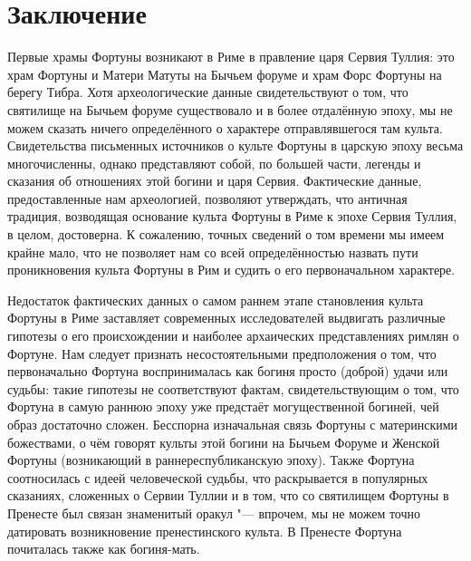 \chapter*{Заключение}



Первые храмы Фортуны возникают в Риме в правление царя Сервия Туллия: это храм Фортуны и Матери Матуты на Бычьем форуме и храм Форс Фортуны на берегу Тибра. Хотя археологические данные свидетельствуют о том, что святилище на Бычьем форуме существовало и в более отдалённую эпоху, мы не можем сказать ничего определённого о характере отправлявшегося там культа. Свидетельства письменных источников о культе Фортуны в царскую эпоху весьма многочисленны, однако представляют собой, по большей части, легенды и сказания об отношениях этой богини и царя Сервия. Фактические данные, предоставленные нам археологией, позволяют утверждать, что античная традиция, возводящая основание культа Фортуны в Риме к эпохе Сервия Туллия, в целом, достоверна. К сожалению, точных сведений о том времени мы имеем крайне мало, что не позволяет нам со всей определённостью назвать пути проникновения культа Фортуны в Рим и судить о его первоначальном характере.

Недостаток фактических данных о самом раннем этапе становления культа Фортуны в Риме заставляет современных исследователей выдвигать различные гипотезы о его происхождении и наиболее архаических представлениях римлян о Фортуне. Нам следует признать несостоятельными предположения о том, что первоначально Фортуна воспринималась как богиня просто (доброй) удачи или судьбы: такие гипотезы не соответствуют фактам, свидетельствующим о том, что Фортуна в самую раннюю эпоху уже предстаёт могущественной богиней, чей образ достаточно сложен. Бесспорна изначальная связь Фортуны с материнскими божествами, о чём говорят культы этой богини на Бычьем Форуме и Женской Фортуны (возникающий в раннереспубликанскую эпоху). Также Фортуна соотносилась с идеей человеческой судьбы, что раскрывается в популярных сказаниях, сложенных о Сервии Туллии и в том, что со святилищем Фортуны в Пренесте был связан знаменитый оракул "--- впрочем, мы не можем точно датировать возникновение пренестинского культа. В Пренесте Фортуна почиталась также как богиня-мать.

